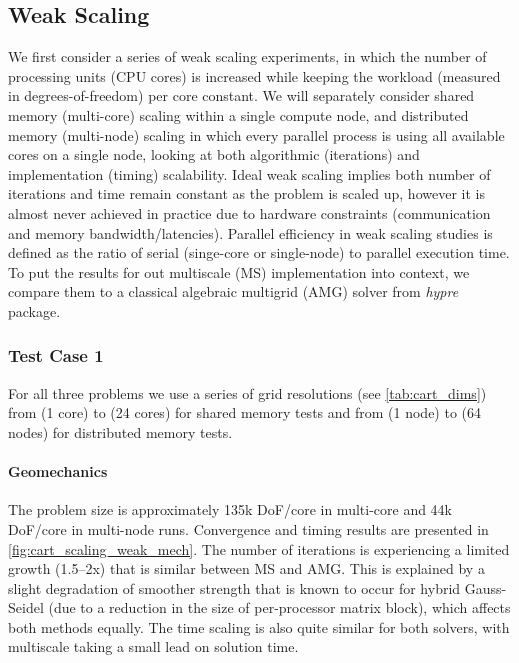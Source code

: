 \subsection{Weak Scaling}
\label{subsec:par_scaling_weak}

We first consider a series of weak scaling experiments, in which the number of processing units (CPU cores) is increased while keeping the workload (measured in degrees-of-freedom) per core constant.   We will separately consider shared memory (multi-core) scaling within a single compute node, and distributed memory (multi-node) scaling in which every parallel process is using all available cores on a single node, looking at both algorithmic (iterations) and implementation (timing) scalability.   Ideal weak scaling implies both number of iterations and time remain constant as the problem is scaled up, however it is almost never achieved in practice due to hardware constraints (communication and memory bandwidth/latencies).   Parallel efficiency in weak scaling studies is defined as the ratio of serial (singe-core or single-node) to parallel execution time.   To put the results for out multiscale (MS) implementation into context, we compare them to a classical algebraic multigrid (AMG) solver from \textit{hypre} package. 

\subsubsection{Test Case 1}

For all three problems we use a series of grid resolutions (see \cref{tab:cart_dims}) from  (1 core) to  (24 cores) for shared memory tests and from  (1 node) to  (64 nodes) for distributed memory tests.   

\paragraph{Geomechanics}
The problem size is approximately 135k DoF/core in multi-core and 44k DoF/core in multi-node runs.   Convergence and timing results are presented in \cref{fig:cart_scaling_weak_mech}.   The number of iterations is experiencing a limited growth (1.5--2x) that is similar between MS and AMG.   This is explained by a slight degradation of smoother strength that is known to occur for hybrid Gauss-Seidel (due to a reduction in the size of per-processor matrix block), which affects both methods equally.   The time scaling is also quite similar for both solvers, with multiscale taking a small lead on solution time.

